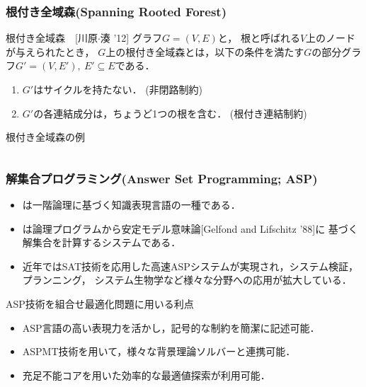 \documentclass[dvipdfmx,11pt]{beamer}
\begin{document}
\begin{frame}\frametitle{根付き全域森(Spanning Rooted Forest)}

 \begin{block}{根付き全域森~~[川原$\cdot$湊 '12]}
  グラフ$G=(V,E)$と，
  \alert{根}と呼ばれる$V$上のノードが与えられたとき，
  $G$上の根付き全域森とは，以下の条件を満たす$G$の部分グラフ$G'=(V,E'),\ E' \subseteq E$である．
  \begin{enumerate}
   \item $G'$はサイクルを持たない． (\alert{非閉路制約})
   \item $G'$の各連結成分は，ちょうど1つの根を含む． (\alert{根付き連結制約})
  \end{enumerate}
 \end{block}

 \begin{exampleblock}{根付き全域森の例}
  \begin{columns}
   \begin{column}{0.45\textwidth}
	\centering
	
   \end{column}
   \begin{column}{0.45\textwidth}
	\centering
	
   \end{column}
  \end{columns}


 \end{exampleblock}
 
\end{frame}

\begin{frame}\frametitle{解集合プログラミング(Answer Set Programming; ASP)}
 \begin{itemize}
  \item {}は一階論理に基づく知識表現言語の一種である．
  \item {}は論理プログラムから安定モデル意味論[Gelfond and Lifschitz '88]に
		基づく解集合を計算するシステムである．
  \item 近年ではSAT技術を応用した高速ASPシステムが実現され，システム検証，プランニング，
		システム生物学など様々な分野への応用が拡大している．
 \end{itemize}

 \begin{alertblock}{ASP技術を組合せ最適化問題に用いる利点}
   \begin{itemize}
	\item ASP言語の高い表現力を活かし，記号的な制約を簡潔に記述可能．
	\item ASPMT技術を用いて，様々な背景理論ソルバーと連携可能．
	\item 充足不能コアを用いた効率的な最適値探索が利用可能．
   \end{itemize}
 \end{alertblock}

\end{frame}
\end{document}
